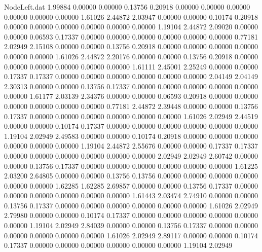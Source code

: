 \begin{filecontents}{NodeLeft.dat}
   1.99884    0.00000    0.00000     0.13756    0.20918    0.00000    0.00000    0.00000    0.00000    0.00000    0.00000    1.61026    2.44872
   2.03947    0.00000    0.00000     0.10174    0.20918    0.00000    0.00000    0.00000    0.00000    0.00000    0.00000    1.19104    2.44872
   2.09020    0.00000    0.00000     0.06593    0.17337    0.00000    0.00000    0.00000    0.00000    0.00000    0.00000    0.77181    2.02949
   2.15108    0.00000    0.00000     0.13756    0.20918    0.00000    0.00000    0.00000    0.00000    0.00000    0.00000    1.61026    2.44872
   2.20176    0.00000    0.00000     0.13756    0.20918    0.00000    0.00000    0.00000    0.00000    0.00000    0.00000    1.61111    2.45001
   2.25249    0.00000    0.00000     0.17337    0.17337    0.00000    0.00000    0.00000    0.00000    0.00000    0.00000    2.04149    2.04149
   2.30313    0.00000    0.00000     0.13756    0.17337    0.00000    0.00000    0.00000    0.00000    0.00000    0.00000    1.61177    2.03139
   2.34376    0.00000    0.00000     0.06593    0.20918    0.00000    0.00000    0.00000    0.00000    0.00000    0.00000    0.77181    2.44872
   2.39448    0.00000    0.00000     0.13756    0.17337    0.00000    0.00000    0.00000    0.00000    0.00000    0.00000    1.61026    2.02949
   2.44519    0.00000    0.00000     0.10174    0.17337    0.00000    0.00000    0.00000    0.00000    0.00000    0.00000    1.19104    2.02949
   2.49583    0.00000    0.00000     0.10174    0.20918    0.00000    0.00000    0.00000    0.00000    0.00000    0.00000    1.19104    2.44872
   2.55676    0.00000    0.00000     0.17337    0.17337    0.00000    0.00000    0.00000    0.00000    0.00000    0.00000    2.02949    2.02949
   2.60742    0.00000    0.00000     0.13756    0.17337    0.00000    0.00000    0.00000    0.00000    0.00000    0.00000    1.61225    2.03200
   2.64805    0.00000    0.00000     0.13756    0.13756    0.00000    0.00000    0.00000    0.00000    0.00000    0.00000    1.62285    1.62285
   2.69857    0.00000    0.00000     0.13756    0.17337    0.00000    0.00000    0.00000    0.00000    0.00000    0.00000    1.61443    2.03474
   2.74910    0.00000    0.00000     0.13756    0.17337    0.00000    0.00000    0.00000    0.00000    0.00000    0.00000    1.61026    2.02949
   2.79980    0.00000    0.00000     0.10174    0.17337    0.00000    0.00000    0.00000    0.00000    0.00000    0.00000    1.19104    2.02949
   2.84039    0.00000    0.00000     0.13756    0.17337    0.00000    0.00000    0.00000    0.00000    0.00000    0.00000    1.61026    2.02949
   2.89117    0.00000    0.00000     0.10174    0.17337    0.00000    0.00000    0.00000    0.00000    0.00000    0.00000    1.19104    2.02949

\end{filecontents}
